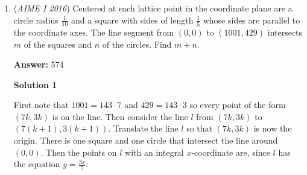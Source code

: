\begin{enumerate}
 



\textbf{Solution 2 (Cancellation)}

As in Solution $1$, let $E(y)$ be the expected value of jumps it takes Freddy to reach the river from the specific $y$ coordinate. We can set up a system of equations. The equation for $E(0)$ is $E(0)=\frac{2}{3}(E(0)+1)+\frac{1}{3}(E(1)+1)$, which, rearranging, gives $E(0)=E(1)+3.$ The equation for $E(23)$ is $E(23)=\frac{1}{2}(E(23)+1)+\frac{1}{4}(E(22)+1)+\frac{1}{4}$ (since $E(24)=0$), and rearranging gives $2E(23)=E(22)+4$.

 
For any other $y$ such that $0<y<23$, we can get the equation $E(y)=\frac{1}{2}(E(y)+1)+\frac{1}{4}(E(y-1)+1)+\frac{1}{4}(E(y+1)+1)$, which can be rearranged to $2E(y)=E(y-1)+E(y+1)+4$. Thus, we can get the following system of equations:\begin{align*}2E(23)&=E(22)+4\\2E(22)&=E(21)+E(23)+4\\2E(21)&=E(20)+E(22)+4\\.\\.\\.\\2E(2)&=E(1)+E(3)+4\\2E(1)&=E(0)+E(2)+4\\E(0)&=E(1)+3.\end{align*}


 Adding all the equations and cancelling results in $E(23)=3+4(23)=95$. From the first equation, $E(22)=2\cdot 95-4=186$, and from the second equation, $E(21)=2\cdot 186-95-4=\boxed{273}.$



	\item (\textit{AIME I 2016}) Centered at each lattice point in the coordinate plane are a circle radius $\frac{1}{10}$ and a square with sides of length $\frac{1}{5}$ whose sides are parallel to the coordinate axes. The line segment from $(0,0)$ to $(1001, 429)$ intersects $m$ of the squares and $n$ of the circles. Find $m + n$.


 
 \textbf{Answer: }574



\textbf{Solution 1}

First note that $1001 = 143 \cdot 7$ and $429 = 143 \cdot 3$ so every point of the form $(7k, 3k)$ is on the line.   Then consider the line $l$ from $(7k, 3k)$ to $(7(k + 1), 3(k + 1))$.  Translate the line $l$ so that $(7k, 3k)$ is now the origin.   There is one square and one circle that intersect the line around $(0,0)$.  Then the points on $l$ with an integral $x$-coordinate are, since $l$ has the equation $y = \frac{3x}{7}$:


\end{enumerate}
